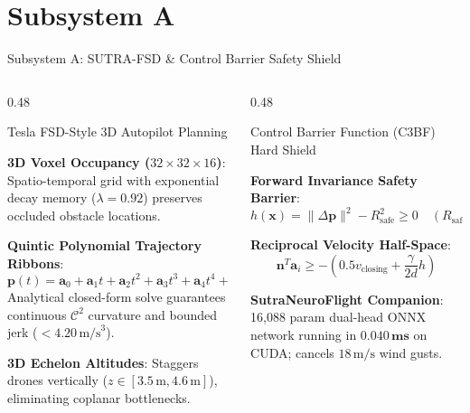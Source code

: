 \documentclass[aspectratio=169, 10pt]{beamer}
\begin{document}
\section{Subsystem A}
\begin{frame}{Subsystem A: SUTRA-FSD \& Control Barrier Safety Shield}
  \begin{columns}[T]
    \begin{column}{0.48\textwidth}
      \begin{defensecard}{Tesla FSD-Style 3D Autopilot Planning}
        \begin{itemize}\setlength{\itemsep}{3pt}
          {\tiny
            \item \textbf{3D Voxel Occupancy ($32\times 32\times 16$)}: Spatio-temporal grid with exponential decay memory ($\lambda = 0.92$) preserves occluded obstacle locations.
            \item \textbf{Quintic Polynomial Trajectory Ribbons}:
            $$\mathbf{p}(t) = \mathbf{a}_0 + \mathbf{a}_1 t + \mathbf{a}_2 t^2 + \mathbf{a}_3 t^3 + \mathbf{a}_4 t^4 + \mathbf{a}_5 t^5$$
            Analytical closed-form solve guarantees continuous $\mathcal{C}^2$ curvature and bounded jerk ($< 4.20\,\text{m/s}^3$).
            \item \textbf{3D Echelon Altitudes}: Staggers drones vertically ($z \in [3.5\,\text{m}, 4.6\,\text{m}]$), eliminating coplanar bottlenecks.
          }
        \end{itemize}
      \end{defensecard}
    \end{column}

    \begin{column}{0.48\textwidth}
      \begin{highlightcard}{Control Barrier Function (C3BF) Hard Shield}
        \begin{itemize}\setlength{\itemsep}{3pt}
          {\tiny
            \item \textbf{Forward Invariance Safety Barrier}:
            $$h(\mathbf{x}) = \|\Delta \mathbf{p}\|^2 - R_{\text{safe}}^2 \ge 0 \quad (R_{\text{safe}} = 2.80\,\text{m})$$
            \item \textbf{Reciprocal Velocity Half-Space}:
            $$\mathbf{n}^T \mathbf{a}_i \ge -\left(0.5 v_{\text{closing}} + \frac{\gamma}{2d} h\right)$$
            \item \textbf{SutraNeuroFlight Companion}: 16,088 param dual-head ONNX network running in $\mathbf{0.040\,\text{ms}}$ on CUDA; cancels $18\,\text{m/s}$ wind gusts.
          }
        \end{itemize}
      \end{highlightcard}
    \end{column}
  \end{columns}
\end{frame}
\end{document}
